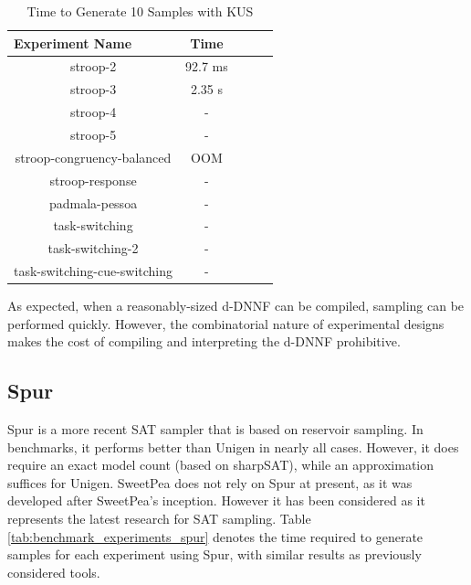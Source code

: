 \begin{table}[htb]
  \centering
  \caption{Time to Generate 10 Samples with KUS}
\begin{tabular}{|c|c|c|c|c|}
\hline
\multicolumn{1}{|l|}{Experiment Name} & Time        \\ \hline
stroop-2                              & 92.7 ms     \\ \hline
stroop-3                              & 2.35 s      \\ \hline
stroop-4                              & -           \\ \hline
stroop-5                              & -           \\ \hline
stroop-congruency-balanced            & OOM         \\ \hline  %
stroop-response                       & -           \\ \hline
padmala-pessoa                        & -           \\ \hline
task-switching                        & -           \\ \hline
task-switching-2                      & -           \\ \hline
task-switching-cue-switching          & -           \\ \hline
\end{tabular}
\label{tab:benchmark_experiments_kus}%
\end{table}

As expected, when a reasonably-sized d-DNNF can be compiled, sampling can be performed quickly. However, the combinatorial nature of experimental designs makes the cost of compiling and interpreting the d-DNNF prohibitive.


\subsection{Spur}

Spur \cite{spur} is a more recent SAT sampler that is based on reservoir sampling. In benchmarks, it performs better than Unigen in nearly all cases. However, it does require an exact model count (based on sharpSAT), while an approximation suffices for Unigen. SweetPea does not rely on Spur at present, as it was developed after SweetPea's inception. However it has been considered as it represents the latest research for SAT sampling. Table \ref{tab:benchmark_experiments_spur} denotes the time required to generate samples for each experiment using Spur, with similar results as previously considered tools.

